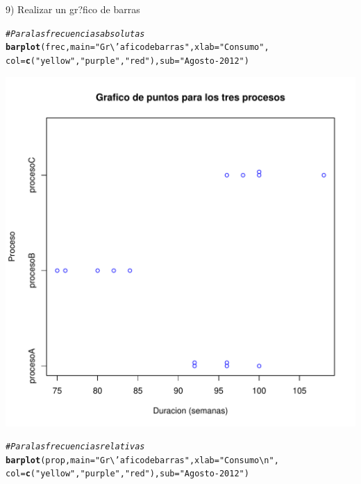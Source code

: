 \documentclass[12pt,letterpaper]{article}\usepackage[]{graphicx}\usepackage[]{color}
\makeatletter
\def\maxwidth{ %
  \ifdim\Gin@nat@width>\linewidth
    \linewidth
  \else
    \Gin@nat@width
  \fi
}
\newcommand{\hlstr}[1]{\textcolor[rgb]{0.192,0.494,0.8}{#1}}%
\newcommand{\hlcom}[1]{\textcolor[rgb]{0.678,0.584,0.686}{\textit{#1}}}%
\newcommand{\hlstd}[1]{\textcolor[rgb]{0.345,0.345,0.345}{#1}}%
\newcommand{\hlkwc}[1]{\textcolor[rgb]{0.333,0.667,0.333}{#1}}%
\newcommand{\hlkwd}[1]{\textcolor[rgb]{0.737,0.353,0.396}{\textbf{#1}}}%
\newenvironment{kframe}{%
 \def\at@end@of@kframe{}%
 \ifinner\ifhmode%
  \def\at@end@of@kframe{\end{minipage}}%
  \begin{minipage}{\columnwidth}%
 \fi\fi%
 \def\FrameCommand##1{\hskip\@totalleftmargin \hskip-\fboxsep
 \colorbox{shadecolor}{##1}\hskip-\fboxsep
     \hskip-\linewidth \hskip-\@totalleftmargin \hskip\columnwidth}%
 \MakeFramed {\advance\hsize-\width
   \@totalleftmargin\z@ \linewidth\hsize
   \@setminipage}}%
 {\par\unskip\endMakeFramed%
 \at@end@of@kframe}
\newenvironment{knitrout}{}{} %
\makeatother
\begin{document}
9) Realizar un gr?fico de barras
\begin{knitrout}
\color{fgcolor}\begin{kframe}
\begin{alltt}
\hlcom{# Para las frecuencias absolutas}
\hlkwd{barplot}\hlstd{(frec,} \hlkwc{main}\hlstd{=}\hlstr{"Gr\textbackslash{}'afico de barras"}\hlstd{,} \hlkwc{xlab}\hlstd{=}\hlstr{" Consumo"}\hlstd{,}
        \hlkwc{col}\hlstd{=}\hlkwd{c}\hlstd{(}\hlstr{"yellow"}\hlstd{,} \hlstr{"purple"}\hlstd{,} \hlstr{"red"}\hlstd{),}\hlkwc{sub}\hlstd{=}\hlstr{"Agosto-2012"}\hlstd{)}
\end{alltt}
\end{kframe}
\includegraphics[width=\maxwidth]{figure/unnamed-chunk-8-1} 
\begin{kframe}\begin{alltt}
\hlcom{# Para las frecuencias relativas}
\hlkwd{barplot}\hlstd{(prop,} \hlkwc{main}\hlstd{=}\hlstr{"Gr\textbackslash{}'afico de barras"}\hlstd{,} \hlkwc{xlab}\hlstd{=}\hlstr{" Consumo\textbackslash{}n"}\hlstd{,}
        \hlkwc{col}\hlstd{=}\hlkwd{c}\hlstd{(}\hlstr{"yellow"}\hlstd{,} \hlstr{"purple"}\hlstd{,}\hlstr{"red"}\hlstd{),} \hlkwc{sub}\hlstd{=}\hlstr{"Agosto-2012"}\hlstd{)}
\end{alltt}
\end{kframe}

\end{knitrout}
\end{document}

